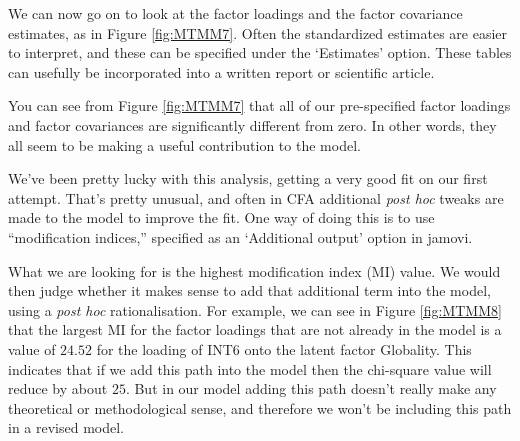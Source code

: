 \documentclass[
]{book}
\begin{document}
We can now go on to look at the factor loadings and the factor covariance estimates, as in Figure \ref{fig:MTMM7}. Often the standardized estimates are easier to interpret, and these can be specified under the `Estimates' option. These tables can usefully be incorporated into a written report or scientific article.

You can see from Figure \ref{fig:MTMM7} that all of our pre-specified factor loadings and factor covariances are significantly different from zero. In other words, they all seem to be making a useful contribution to the model.

We've been pretty lucky with this analysis, getting a very good fit on our first attempt. That's pretty unusual, and often in CFA additional \emph{post hoc} tweaks are made to the model to improve the fit. One way of doing this is to use ``modification indices,'' specified as an `Additional output' option in jamovi.

What we are looking for is the highest modification index (MI) value. We would then judge whether it makes sense to add that additional term into the model, using a \emph{post hoc} rationalisation. For example, we can see in Figure \ref{fig:MTMM8} that the largest MI for the factor loadings that are not already in the model is a value of \(24.52\) for the loading of INT6 onto the latent factor Globality. This indicates that if we add this path into the model then the chi-square value will reduce by about \(25\). But in our model adding this path doesn't really make any theoretical or methodological sense, and therefore we won't be including this path in a revised model.
\end{document}
